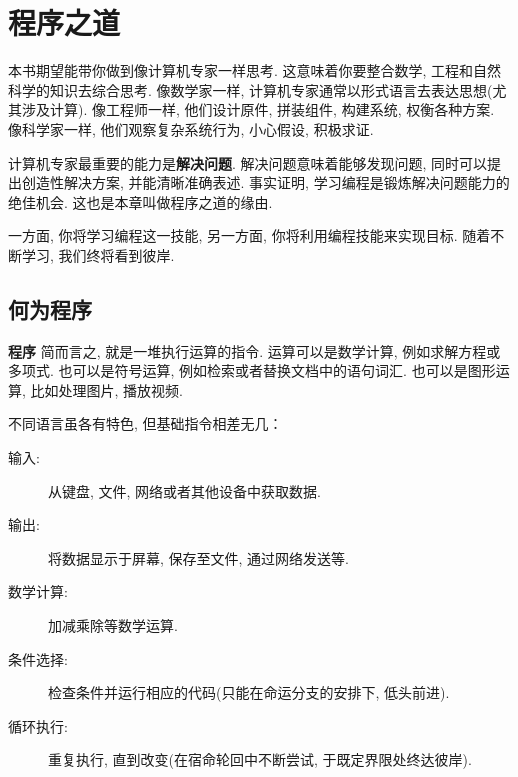 \documentclass[10pt]{book}
\begin{document}
\begin{latexonly}

\tableofcontents

\clearemptydoublepage

\end{latexonly}

\mainmatter

\chapter{程序之道}

本书期望能带你做到像计算机专家一样思考. 
这意味着你要整合数学, 工程和自然科学的知识去综合思考. 
像数学家一样, 计算机专家通常以形式语言去表达思想(尤其涉及计算). 
像工程师一样, 他们设计原件, 拼装组件, 构建系统, 权衡各种方案. 
像科学家一样, 他们观察复杂系统行为, 小心假设, 积极求证. 

计算机专家最重要的能力是{\bf 解决问题}. 
解决问题意味着能够发现问题, 同时可以提出创造性解决方案, 并能清晰准确表述. 
事实证明, 学习编程是锻炼解决问题能力的绝佳机会. 
这也是本章叫做程序之道的缘由. 
 
一方面, 你将学习编程这一技能, 另一方面, 你将利用编程技能来实现目标. 
随着不断学习, 我们终将看到彼岸. 

\section{何为程序}

{\bf 程序} 简而言之, 就是一堆执行运算的指令. 
运算可以是数学计算, 例如求解方程或多项式. 
也可以是符号运算, 例如检索或者替换文档中的语句词汇. 
也可以是图形运算, 比如处理图片, 播放视频. 

不同语言虽各有特色, 但基础指令相差无几：

\begin{description}

\item[输入:] 从键盘, 文件, 网络或者其他设备中获取数据. 

\item[输出:] 将数据显示于屏幕, 保存至文件, 通过网络发送等. 

\item[数学计算:] 加减乘除等数学运算. 

\item[条件选择:] 检查条件并运行相应的代码(只能在命运分支的安排下, 低头前进). 

\item[循环执行:] 重复执行, 直到改变(在宿命轮回中不断尝试, 于既定界限处终达彼岸). 

\end{description}
\end{document}
